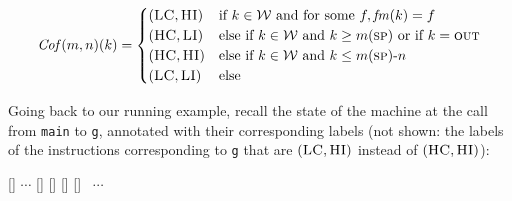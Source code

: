 \documentclass[acmsmall,review,anonymous]{acmart}\settopmatter{printfolios=true,printccs=false,printacmref=false}
\begin{document}
 \[\mathit{Cof}(m,n)(k) =
  \begin{cases}
    (\textsc{LC},\textsc{HI}) & \text{if } k \in {\mathcal W}
                         \text{ and for some } f, \mathit{fm}(k) = f \\
    (\textsc{HC},\textsc{LI}) & \text{else if } k \in {\mathcal W}
                          \text{ and } k \geq m(\textsc{sp})
                          \text{ or if } k = \textsc{out}\\
    (\textsc{HC},\textsc{HI}) & \text{else if } k \in {\mathcal W}
                          \text{ and } k \leq m(\textsc{sp}) \textrm{-}  n \\
    (\textsc{LC},\textsc{LI}) & \text{else} \\
  \end{cases}\]

Going back to our running example, recall the state of the machine at
the call from {\tt main} to {\tt g}, annotated with their
corresponding labels (not shown: the labels of the instructions
corresponding to {\tt g} that are $(\textsc{LC}, \textsc{HI})$ instead of
$(\HIGHSEC, \HIGHINT)$):
\vspace*{0.2em}
\begin{center}
\MemoryLabel{43.5em}{2em}{\SP}
[{\makebox[0pt]{$(\HIGHSEC,\HIGHINT)$}}]%
\hspace*{3pt}
$\cdots$
[{\makebox[0pt]{$(\HIGHSEC, \LOWINT)$}}]%
[{\makebox[0pt]{$(\HIGHSEC, \HIGHINT)$}}]%
[{\makebox[0pt]{$(\LOWSEC, \LOWINT)$}}]%
[{\makebox[0pt]{$(\HIGHSEC, \LOWINT)$}}]
~$\cdots$
\\
\end{center}

\end{document}
